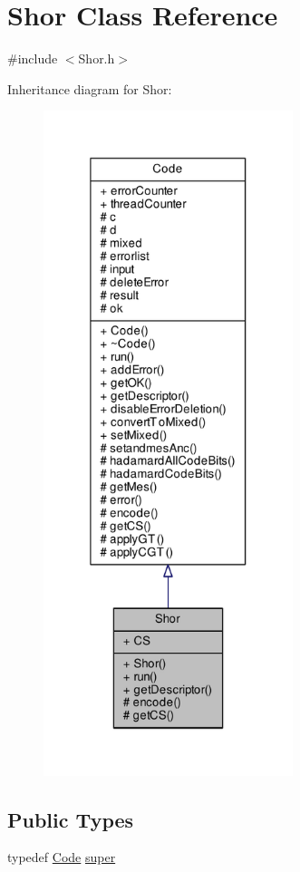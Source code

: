 \hypertarget{class_shor}{}\section{Shor Class Reference}
\label{class_shor}


{\ttfamily \#include $<$Shor.\+h$>$}



Inheritance diagram for Shor\+:\nopagebreak
\begin{figure}[H]
\begin{center}
\leavevmode
\includegraphics[height=550pt]{class_shor__inherit__graph}
\end{center}
\end{figure}
\subsection*{Public Types}
\begin{DoxyCompactItemize}
\item 
typedef \hyperlink{class_code}{Code} \hyperlink{class_shor_a7ea95c357f9d816b3a37176aa4e01781}{super}
\end{DoxyCompactItemize}
